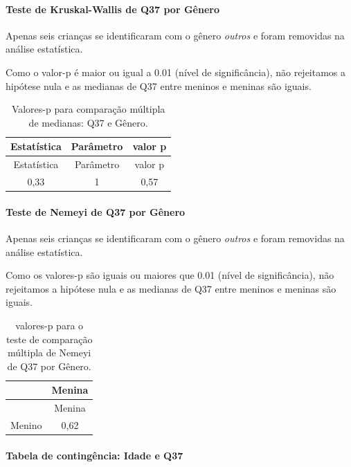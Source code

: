 \documentclass[]{article}
\let\oldparagraph\paragraph
\renewcommand{\paragraph}[1]{\oldparagraph{#1}\mbox{}}
\begin{document}
\hypertarget{teste-de-kruskal-wallis-de-q37-por-guxeanero}{%
\paragraph{Teste de Kruskal-Wallis de Q37 por Gênero}\label{teste-de-kruskal-wallis-de-q37-por-guxeanero}}

Apenas seis crianças se identificaram com o gênero \emph{outros} e foram removidas na análise estatística.

Como o valor-p é maior ou igual a 0.01 (nível de significância), não rejeitamos a hipótese nula e as medianas de Q37 entre meninos e meninas são iguais.

\begin{longtable}[]{@{}ccc@{}}
\caption{\label{tab:unnamed-chunk-1387}Valores-p para comparação múltipla de medianas: Q37 e Gênero.}\tabularnewline
\toprule
Estatística & Parâmetro & valor p\tabularnewline
\midrule
\endfirsthead
\toprule
Estatística & Parâmetro & valor p\tabularnewline
\midrule
\endhead
0,33 & 1 & 0,57\tabularnewline
\bottomrule
\end{longtable}

\hypertarget{teste-de-nemeyi-de-q37-por-guxeanero}{%
\paragraph{Teste de Nemeyi de Q37 por Gênero}\label{teste-de-nemeyi-de-q37-por-guxeanero}}

Apenas seis crianças se identificaram com o gênero \emph{outros} e foram removidas na análise estatística.

Como os valores-p são iguais ou maiores que 0.01 (nível de significância), não rejeitamos a hipótese nula e as medianas de Q37 entre meninos e meninas são iguais.

\begin{longtable}[]{@{}lc@{}}
\caption{\label{tab:unnamed-chunk-1389}valores-p para o teste de comparação múltipla de Nemeyi de Q37 por Gênero.}\tabularnewline
\toprule
& Menina\tabularnewline
\midrule
\endfirsthead
\toprule
& Menina\tabularnewline
\midrule
\endhead
Menino & 0,62\tabularnewline
\bottomrule
\end{longtable}

\cleardoublepage

\hypertarget{tabela-de-continguxeancia-idade-e-q37}{%
\paragraph{Tabela de contingência: Idade e Q37}\label{tabela-de-continguxeancia-idade-e-q37}}
\end{document}
